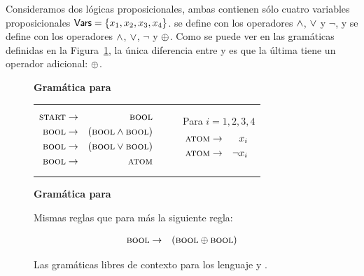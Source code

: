 
Consideramos dos lógicas proposicionales, ambas contienen sólo cuatro variables proposicionales  ${\sf Vars}=\{x_1, x_2, x_3, x_4\}$. \grambool se define con los operadores $\wedge$, $\vee$ y $\lnot$, y \gramboolxor se define con los operadores $\wedge$, $\vee$, $\lnot$ y $\oplus$. Como se puede ver en las gramáticas definidas en la Figura~\ref{PCFG}, la única diferencia entre \grambool y \gramboolxor es que la última tiene un operador adicional: $\oplus$.  
 \begin{figure}[h!]
\centering
\small
{\bf Gramática para \grambool}
\begin{tabular}{ccc}
\begin{minipage}[h]{0,4\textwidth}
\begin{eqnarray*}
\textsc{start} &\to&\textsc{bool}\\
\textsc{bool} &\to&(\textsc{bool} \wedge \textsc{bool}) \\
\textsc{bool} &\to&(\textsc{bool} \vee \textsc{bool}) \\
\textsc{bool} &\to&\textsc{atom}
\end{eqnarray*}
\end{minipage}
&
\ \quad
&
\begin{minipage}[h]{0,4\textwidth}
\ \qquad Para $i=1,2,3,4$
\begin{eqnarray*}
\textsc{atom} &\to& x_i \\
\textsc{atom} &\to&\lnot x_i 
\end{eqnarray*}
\end{minipage}
\end{tabular}

\bigskip

{\bf Gramática para \gramboolxor}

Mismas reglas que para \grambool más la siguiente regla:

\begin{minipage}[h]{0,4\textwidth}
\begin{eqnarray*}
\textsc{bool} &\to&(\textsc{bool} \oplus \textsc{bool}) \\
\end{eqnarray*}
\end{minipage}

      \caption{Las gramáticas libres de contexto para los lenguaje \grambool y \gramboolxor.}
      \label{PCFG}
   \end{figure}


